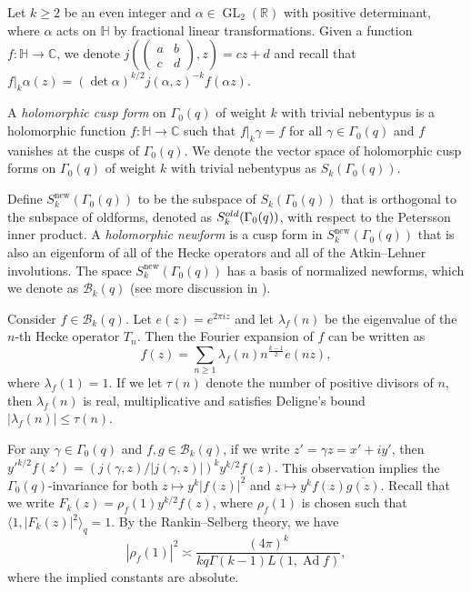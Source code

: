 \documentclass[12pt,reqno]{amsart}
\theoremstyle{remark}
\newcommand{\h}{\mathbb{H}}
\DeclareMathOperator{\GL}{GL}
\DeclareMathOperator{\ad}{Ad}
\DeclareMathOperator{\new}{new}
\numberwithin{equation}{section}
\begin{document}
	Let $k \geq 2$ be an even integer and $\alpha \in \GL_2 (\mathbb{R})$ with positive determinant, where $\alpha$ acts on $\h$ by fractional linear transformations. Given a function $f: \h \to \mathbb{C}$, we denote $j((\begin{smallmatrix} a & b\\ c & d \end{smallmatrix}),z) = cz+d$ and recall that $f|_k \alpha(z) = (\det\alpha)^{k/2}j(\alpha, z)^{-k}f(\alpha z)$. 
	
    
    A \textit{holomorphic cusp form} on $\Gamma_0(q)$ of weight $k$ with trivial nebentypus is a holomorphic function $f: \h \to \mathbb{C}$ such that $f|_k \gamma = f$ for all $\gamma \in \Gamma_0(q)$ and $f$ vanishes at the cusps of $\Gamma_0(q)$. 
    We denote the vector space of holomorphic cusp forms on $\Gamma_0(q)$ of weight $k$ with trivial nebentypus as $S_k(\Gamma_0(q))$.
    
    Define $S_k^{\new}(\Gamma_0(q))$ to be the subspace of $S_k(\Gamma_0(q))$ that is orthogonal to the subspace of oldforms, denoted as $S_k^{\textup{old}}(\Gamma_0(q))$, with respect to the Petersson inner product.
    A \textit{holomorphic newform} is a cusp form in $S_k^{\new}(\Gamma_0(q))$ that is also an eigenform of all of the Hecke operators and all of the Atkin--Lehner involutions. The space $S_k^{\new}(\Gamma_0(q))$ has a basis of normalized newforms, which we denote as $\mathcal{B}_k(q)$ (see more discussion in \cite[Chapter 2, Section 5]{O}).  
    

    Consider $f \in \mathcal{B}_k(q)$. Let $e(z) = e^{2\pi iz}$ and let $\lambda_f(n)$ be the eigenvalue of the $n$-th Hecke operator $T_n$. Then the Fourier expansion of $f$ can be written as
	\begin{equation}
        \label{eq:Fourier-newform}
		f(z) = \sum_{n \ge 1} \lambda_f(n)n^{\frac{k-1}{2}}e(nz),
	\end{equation} 
    where $\lambda_f(1) = 1$. If we let $\tau(n)$ denote the number of positive divisors of $n$, then $\lambda_f(n)$ is real, multiplicative and satisfies Deligne's bound $|\lambda_f(n)| \le \tau(n)$.
    
    For any $\gamma \in \Gamma_0(q)$ and $f,g \in \mathcal{B}_k(q)$, if we write $z' = \gamma z = x'+iy'$, then 
        $y'^{k/2}f(z') = (j(\gamma,z)/|j(\gamma,z)|)^ky^{k/2}f(z).$  
    This observation implies the $\Gamma_0(q)$-invariance for both $z \mapsto y^{k}|f(z)|^2$ and $z \mapsto y^{k}f(z)\overline{g(z)}$.
    Recall that we write  $F_k(z) = \rho_f(1)y^{k/2}f(z)$,
    where $\rho_f(1)$ is chosen such that $ \langle 1, |F_k(z)|^2 \rangle_q = 1$. By the Rankin--Selberg theory, we  have \begin{equation}\label{eq:rho_f(1)}
		|\rho_f(1)|^2 
  \asymp \frac{(4\pi)^{k}}{kq\Gamma(k-1)L(1, \ad f)},
	\end{equation}
    where the implied constants are absolute.
\end{document}
